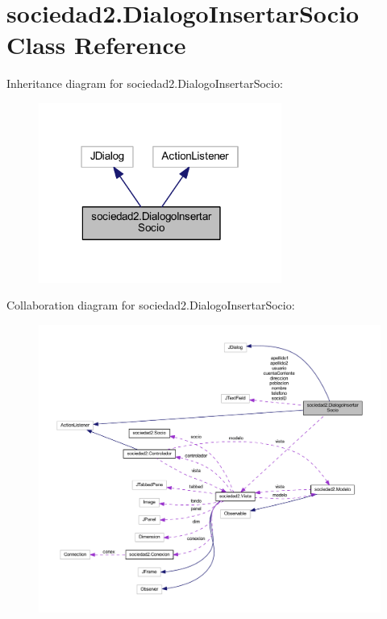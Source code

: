 \hypertarget{classsociedad2_1_1_dialogo_insertar_socio}{}\section{sociedad2.\+Dialogo\+Insertar\+Socio Class Reference}
\label{classsociedad2_1_1_dialogo_insertar_socio}


Inheritance diagram for sociedad2.\+Dialogo\+Insertar\+Socio\+:
\nopagebreak
\begin{figure}[H]
\begin{center}
\leavevmode
\includegraphics[width=226pt]{classsociedad2_1_1_dialogo_insertar_socio__inherit__graph}
\end{center}
\end{figure}


Collaboration diagram for sociedad2.\+Dialogo\+Insertar\+Socio\+:
\nopagebreak
\begin{figure}[H]
\begin{center}
\leavevmode
\includegraphics[width=350pt]{classsociedad2_1_1_dialogo_insertar_socio__coll__graph}
\end{center}
\end{figure}
